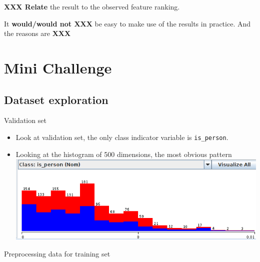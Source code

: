 \documentclass[12pt,journal,compsoc]{IEEEtran}
\begin{document}
\textbf{XXX Relate} the result to the observed feature ranking.

It \textbf{would/would not XXX} be easy to make use of the results in practice. And the reasons are \textbf{XXX}

\section{Mini Challenge}
\subsection*{Dataset exploration}
Validation set

\begin{itemize}
\item Look at validation set, the only class indicator variable is \texttt{is_person}.

\item Looking at the histogram of 500 dimensions, the most obvious pattern 
\includegraphics[scale=0.5]{264_val}
\end{itemize}

Preprocessing data for training set

\end{document}
